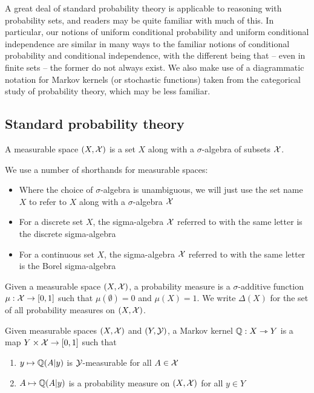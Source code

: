 A great deal of standard probability theory is applicable to reasoning with probability sets, and readers may be quite familiar with much of this. In particular, our notions of uniform conditional probability and uniform conditional independence are similar in many ways to the familiar notions of conditional probability and conditional independence, with the different being that -- even in finite sets -- the former do not always exist. We also make use of a diagrammatic notation for Markov kernels (or stochastic functions) taken from the categorical study of probability theory, which may be less familiar.

\subsection{Standard probability theory}

\begin{definition}
A measurable space $(X,\mathcal{X})$ is a set $X$ along with a $\sigma$-algebra of subsets $\mathcal{X}$.
\end{definition}

We use a number of shorthands for measurable spaces:
\begin{itemize}
	\item Where the choice of $\sigma$-algebra is unambiguous, we will just use the set name $X$ to refer to $X$ along with a $\sigma$-algebra $\mathcal{X}$
	\item For a discrete set $X$, the sigma-algebra $\mathcal{X}$ referred to with the same letter is the discrete sigma-algebra
	\item For a continuous set $X$, the sigma-algebra $\mathcal{X}$ referred to with the same letter is the Borel sigma-algebra
\end{itemize}

\begin{definition}
Given a measurable space $(X,\mathcal{X})$, a probability measure is a $\sigma$-additive function $\mu:\mathcal{X}\to [0,1]$ such that $\mu(\emptyset)=0$ and $\mu(X)=1$. We write $\Delta(X)$ for the set of all probability measures on $(X,\mathcal{X})$.
\end{definition}

\begin{definition}\label{def:mkern}
Given measurable spaces $(X,\mathcal{X})$ and $(Y,\mathcal{Y})$, a Markov kernel $\mathbb{Q}:X\rightarrowtriangle Y$ is a map $Y\times \mathcal{X}\to [0,1]$ such that
\begin{enumerate}
	\item $y\mapsto \mathbb{Q}(A|y)$ is $\mathcal{Y}$-measurable for all $A\in \mathcal{X}$
	\item $A\mapsto \mathbb{Q}(A|y)$ is a probability measure on $(X,\mathcal{X})$ for all $y\in Y$
\end{enumerate}
\end{definition}

